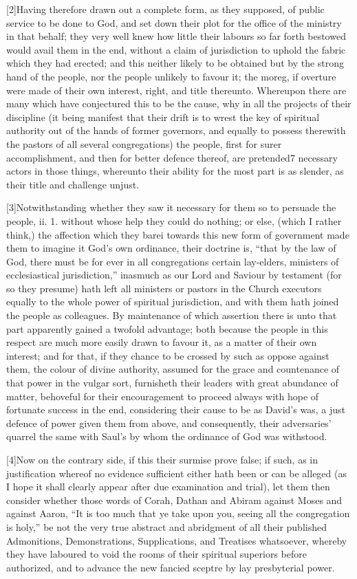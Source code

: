 [2]Having therefore drawn out a complete form, as they supposed, of public service to be done to God, and set down their plot for the office of the ministry in that behalf; they very well knew how little their labours so far forth bestowed would avail them in the end, without a claim of jurisdiction to uphold the fabric which they had erected; and this neither likely to be obtained but by the strong hand of the people, nor the people unlikely to favour it; the moreg, if overture were made of their own interest, right, and title thereunto. Whereupon there are many which have conjectured this to be the cause, why in all the projects of their discipline (it being manifest that their drift is to wrest the key of spiritual authority out of the hands of former governors, and equally to possess therewith the pastors of all several congregations) the people, first for surer accomplishment, and then for better defence thereof, are pretended7 necessary actors in those things, whereunto their ability for the most part is as slender, as their title and challenge unjust.

[3]Notwithstanding whether they saw it necessary for them so to persuade the people, ii. 1. without whose help they could do nothing; or else, (which I rather think,) the affection which they barei towards this new form of government made them to imagine it God’s own ordinance, their doctrine is, “that by the law of God, there must be for ever in all congregations certain lay-elders, ministers of ecclesiastical jurisdiction,” inasmuch as our Lord and Saviour by testament (for so they presume) hath left all ministers or pastors in the Church executors equally to the whole power of spiritual jurisdiction, and with them hath joined the people as colleagues. By maintenance of which assertion there is unto that part apparently gained a twofold advantage; both because the people in this respect are much more easily drawn to favour it, as a matter of their own interest; and for that, if they chance to be crossed by such as oppose against them, the colour of divine authority, assumed for the grace and countenance of that power in the vulgar sort, furnisheth their leaders with great abundance of matter, behoveful for their encouragement to proceed always with hope of fortunate success in the end, considering their cause to be as David’s was, a just defence of power given them from above, and consequently, their adversaries’ quarrel the same with Saul’s by whom the ordinance of God was withstood.

[4]Now on the contrary side, if this their surmise prove false; if such, as in justification whereof no evidence sufficient either hath been or can be alleged (as I hope it shall clearly appear after due examination and trial), let them then consider whether those words of Corah, Dathan and Abiram against Moses and against Aaron, “It is too much that ye take upon you, seeing all the congregation is holy,” be not the very true abstract and abridgment of all their published Admonitions, Demonstrations, Supplications, and Treatises whatsoever, whereby they have laboured to void the rooms of their spiritual superiors before authorized, and to advance the new fancied sceptre by lay presbyterial power.

